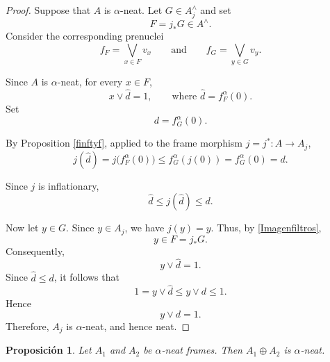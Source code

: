 \documentclass[11pt]{amsart}
\theoremstyle{plain}
\newtheorem{prop}[thm]{Proposición}
\theoremstyle{definition}
\begin{document}
\begin{proof}
Suppose that \(A\) is \(\alpha\)-neat. Let \(G\in A_j^\wedge\) and set
\[
    F=j_*G\in A^\wedge.
\]
Consider the corresponding prenuclei
\[
    f_F=\bigvee_{x\in F}v_x
    \qquad\text{and}\qquad
    f_G=\bigvee_{y\in G}v_y.
\]

Since \(A\) is \(\alpha\)-neat, for every \(x\in F\),
\[
    x\vee\widehat d=1,
    \qquad
    \text{where }
    \widehat d=f_F^\alpha(0).
\]
Set
\[
    d=f_G^\alpha(0).
\]

By Proposition \ref{finftyf}, applied to the frame morphism
\(j=j^*\colon A\to A_j\),
\[
    j(\widehat d)
    =j\bigl(f_F^\alpha(0)\bigr)
    \leq f_G^\alpha(j(0))
    =f_G^\alpha(0)
    =d.
\]

Since \(j\) is inflationary,
\[
    \widehat d\leq j(\widehat d)\leq d.
\]

Now let \(y\in G\). Since \(y\in A_j\), we have \(j(y)=y\).
Thus, by \eqref{Imagenfiltros},
\[
    y\in F=j_*G.
\]
Consequently,
\[
    y\vee\widehat d=1.
\]
Since \(\widehat d\leq d\), it follows that
\[
    1
    =y\vee\widehat d
    \leq y\vee d
    \leq1.
\]
Hence
\[
    y\vee d=1.
\]
Therefore, \(A_j\) is \(\alpha\)-neat, and hence neat.
\end{proof}

\begin{prop}\label{tidyplus}
Let \(A_1\) and \(A_2\) be \(\alpha\)-neat frames. Then
\(A_1\oplus A_2\) is \(\alpha\)-neat.
\end{prop}
\end{document}
